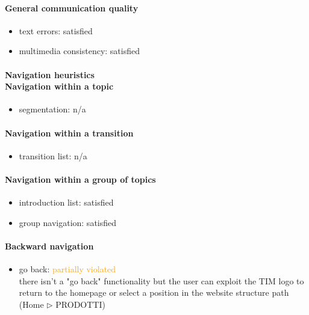 \begin{enumerate}
	\paragraph*{General communication quality}
	\begin{itemize}
		\item text errors: satisfied
		\item multimedia consistency: satisfied
	\end{itemize}

	\paragraph*{Navigation heuristics \\ Navigation within a topic}
	\begin{itemize}
		\item segmentation: n/a
	\end{itemize}	
	
	\paragraph*{Navigation within a transition}
	\begin{itemize}
		\item transition list: n/a
	\end{itemize}
	
	\paragraph*{Navigation within a group of topics}
	\begin{itemize}
		\item introduction list: satisfied
		\item group navigation: satisfied
	\end{itemize}

	\paragraph*{Backward navigation}
	\begin{itemize}
		\item go back: \textcolor {orange}{partially violated}\\
		there isn't a "go back" functionality but the user can exploit the TIM logo to return to the homepage or select a position in the website structure path (Home $\triangleright$ PRODOTTI)
	\end{itemize}
	

\end{enumerate}
